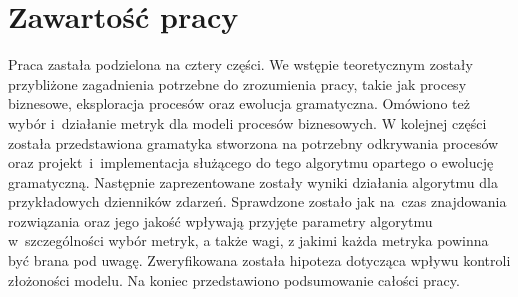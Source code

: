 \section{Zawartość pracy}
\label{sec:zawartoscPracy}

Praca zastała podzielona na cztery części. We wstępie teoretycznym zostały przybliżone zagadnienia potrzebne do zrozumienia pracy, takie jak procesy biznesowe, eksploracja procesów oraz ewolucja gramatyczna. Omówiono też wybór i~działanie metryk dla modeli procesów biznesowych. W kolejnej części została przedstawiona gramatyka stworzona na potrzebny odkrywania procesów oraz projekt~i~implementacja służącego do tego algorytmu opartego o ewolucję gramatyczną. Następnie zaprezentowane zostały wyniki działania algorytmu dla przykładowych dzienników zdarzeń. Sprawdzone zostało jak na~czas znajdowania rozwiązania oraz jego jakość wpływają przyjęte parametry algorytmu w~szczególności wybór metryk, a także wagi, z jakimi każda metryka powinna być brana pod uwagę. Zweryfikowana została hipoteza dotycząca wpływu kontroli złożoności modelu. Na koniec przedstawiono podsumowanie całości pracy. 
